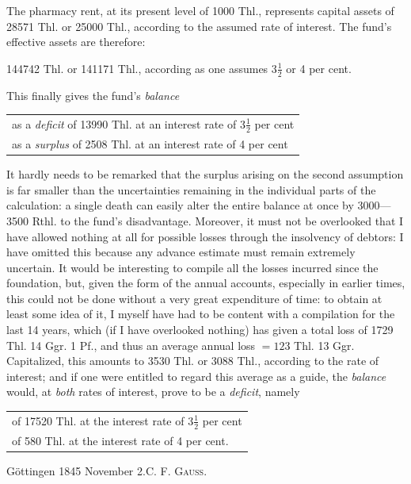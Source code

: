 The pharmacy rent, at its present level of 1000 Thl., represents capital assets of 28571 Thl. or 25000 Thl., according to the assumed rate of interest. The fund's effective assets are therefore:
\begin{center}
144742 Thl. or 141171 Thl., according as one assumes \(3\tfrac{1}{2}\) or 4 per cent.
\end{center}
\noindent\hspace*{\parindent}This finally gives the fund's \textit{balance}
\begin{center}
\begin{tabular}{l}
as a \textit{deficit} of 13990 Thl. at an interest rate of \(3\tfrac{1}{2}\) per cent\\
as a \textit{surplus} of 2508 Thl. at an interest rate of 4 per cent
\end{tabular}
\end{center}
\noindent\hspace*{\parindent}It hardly needs to be remarked that the surplus arising on the second assumption is far smaller than the uncertainties remaining in the individual parts of the calculation: a single death can easily alter the entire balance at once by 3000—3500 Rthl. to the fund's disadvantage. Moreover, it must not be overlooked that I have allowed nothing at all for possible losses through the insolvency of debtors: I have omitted this because any advance estimate must remain extremely uncertain. It would be interesting to compile all the losses incurred since the foundation, but, given the form of the annual accounts, especially in earlier times, this could not be done without a very great expenditure of time: to obtain at least some idea of it, I myself have had to be content with a compilation for the last 14 years, which (if I have overlooked nothing) has given a total loss of 1729 Thl. 14 Ggr. 1 Pf., and thus an average annual loss \(=123\) Thl. 13 Ggr. Capitalized, this amounts to 3530 Thl. or 3088 Thl., according to the rate of interest; and if one were entitled to regard this average as a guide, the \textit{balance} would, at \textit{both} rates of interest, prove to be a \textit{deficit}, namely
\begin{center}
\begin{tabular}{l}
of 17520 Thl. at the interest rate of \(3\tfrac{1}{2}\) per cent\\
of\phantom{ 17} 580 Thl. at the interest rate of 4 per cent.
\end{tabular}
\end{center}
\noindent Göttingen 1845 November 2.\hfill C. F. \textsc{Gauss}.

